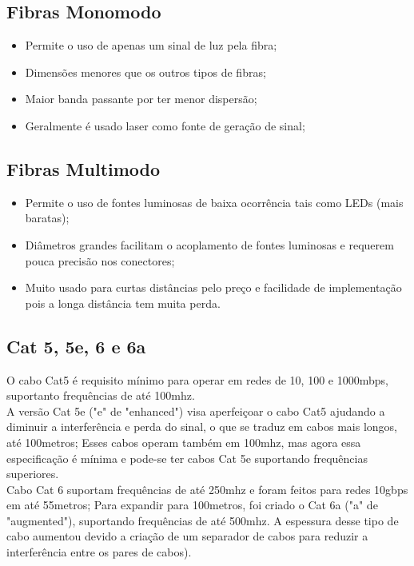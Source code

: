 \documentclass{article}
\begin{document}
\subsection{Fibras Monomodo}
\begin{itemize}
	\item Permite o uso de apenas um sinal de luz pela fibra;
	\item Dimensões menores que os outros tipos de fibras;
	\item Maior banda passante por ter menor dispersão;
	\item Geralmente é usado laser como fonte de geração de sinal;
\end{itemize}

\subsection{Fibras Multimodo}
\begin{itemize}
	\item Permite o uso de fontes luminosas de baixa ocorrência tais
como LEDs (mais baratas);
	\item Diâmetros grandes facilitam o acoplamento de fontes
luminosas e requerem pouca precisão nos conectores;
	\item Muito usado para curtas distâncias pelo preço e facilidade
de implementação pois a longa distância tem muita perda.
\end{itemize}

\subsection{Cat 5, 5e, 6 e 6a}
O cabo Cat5 é requisito mínimo para operar em redes de 10, 100 e 1000mbps,
suportanto frequências de até 100mhz.\\ A versão Cat 5e ("e" de "enhanced") visa
aperfeiçoar o cabo Cat5 ajudando a diminuir a interferência e perda do sinal, o
que se traduz em cabos mais longos, até 100metros; Esses cabos operam também em
100mhz, mas agora essa especificação é mínima e pode-se ter cabos Cat 5e
suportando frequências superiores.\\ Cabo Cat 6 suportam frequências de até 250mhz e foram
feitos para redes 10gbps em até 55metros; Para expandir para 100metros, foi
criado o Cat 6a ("a" de "augmented"), suportando frequências de até 500mhz. A
espessura desse tipo de cabo aumentou devido a criação de um separador de cabos
para reduzir a interferência entre os pares de cabos).
\end{document}
